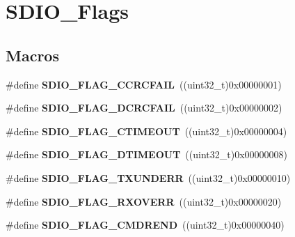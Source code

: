 \hypertarget{group___s_d_i_o___flags}{\section{S\-D\-I\-O\-\_\-\-Flags}
\label{group___s_d_i_o___flags}
}
\subsection*{Macros}
\begin{DoxyCompactItemize}
\item 
\hypertarget{group___s_d_i_o___flags_ga8ff1f3960378e05ec3c949940e1c49d0}{\#define {\bfseries S\-D\-I\-O\-\_\-\-F\-L\-A\-G\-\_\-\-C\-C\-R\-C\-F\-A\-I\-L}~((uint32\-\_\-t)0x00000001)}\label{group___s_d_i_o___flags_ga8ff1f3960378e05ec3c949940e1c49d0}

\item 
\hypertarget{group___s_d_i_o___flags_ga6de936ea11cbc79444d519268ad9f9bd}{\#define {\bfseries S\-D\-I\-O\-\_\-\-F\-L\-A\-G\-\_\-\-D\-C\-R\-C\-F\-A\-I\-L}~((uint32\-\_\-t)0x00000002)}\label{group___s_d_i_o___flags_ga6de936ea11cbc79444d519268ad9f9bd}

\item 
\hypertarget{group___s_d_i_o___flags_ga7389f64ff6cfa4f459bf852b5faede30}{\#define {\bfseries S\-D\-I\-O\-\_\-\-F\-L\-A\-G\-\_\-\-C\-T\-I\-M\-E\-O\-U\-T}~((uint32\-\_\-t)0x00000004)}\label{group___s_d_i_o___flags_ga7389f64ff6cfa4f459bf852b5faede30}

\item 
\hypertarget{group___s_d_i_o___flags_ga2d2fd219dd9fea522862195ab9568345}{\#define {\bfseries S\-D\-I\-O\-\_\-\-F\-L\-A\-G\-\_\-\-D\-T\-I\-M\-E\-O\-U\-T}~((uint32\-\_\-t)0x00000008)}\label{group___s_d_i_o___flags_ga2d2fd219dd9fea522862195ab9568345}

\item 
\hypertarget{group___s_d_i_o___flags_gabd18f8e5d5387a38dccbe1bf28ae5dbc}{\#define {\bfseries S\-D\-I\-O\-\_\-\-F\-L\-A\-G\-\_\-\-T\-X\-U\-N\-D\-E\-R\-R}~((uint32\-\_\-t)0x00000010)}\label{group___s_d_i_o___flags_gabd18f8e5d5387a38dccbe1bf28ae5dbc}

\item 
\hypertarget{group___s_d_i_o___flags_gad49d60039e40d31b734cfacf90caa84f}{\#define {\bfseries S\-D\-I\-O\-\_\-\-F\-L\-A\-G\-\_\-\-R\-X\-O\-V\-E\-R\-R}~((uint32\-\_\-t)0x00000020)}\label{group___s_d_i_o___flags_gad49d60039e40d31b734cfacf90caa84f}

\item 
\hypertarget{group___s_d_i_o___flags_ga083531db75a1e4c05c47578763d53af1}{\#define {\bfseries S\-D\-I\-O\-\_\-\-F\-L\-A\-G\-\_\-\-C\-M\-D\-R\-E\-N\-D}~((uint32\-\_\-t)0x00000040)}\label{group___s_d_i_o___flags_ga083531db75a1e4c05c47578763d53af1}


\end{DoxyCompactItemize}
